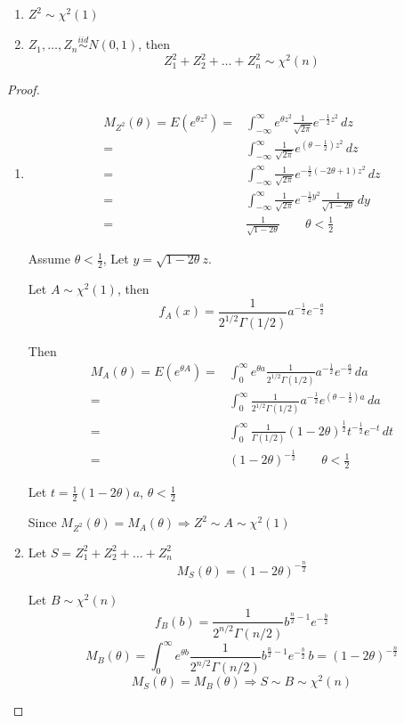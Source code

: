 \begin{exmp}
\begin{enumerate}
\item $Z^2 \sim \chi^2(1)$
\item $Z_1,\dots,Z_n \overset{iid}{\sim} N(0,1)$, then 
\[Z_1^2 +Z_2^2+\dots+Z_n^2 \sim \chi^2(n)\] 
\end{enumerate}
\begin{proof}
\begin{enumerate}
\item \begin{align*}
M_{Z^2}(\theta)=E(e^{\theta z^2}) = & \int_{-\infty}^\infty e^{\theta z^2} \frac{1}{\sqrt{2 \pi}} e^{-\frac{1}{2} z^2} \, dz \\
= & \int_{-\infty}^\infty \frac{1}{\sqrt{2 \pi}} e^{\left(\theta-\frac{1}{2}\right) z^2} \,dz \\
= & \int_{-\infty}^\infty  \frac{1}{\sqrt{2 \pi}} e^{-\frac{1}{2}\left(-2\theta+1\right) z^2} \,dz \\
= & \int_{-\infty}^\infty  \frac{1}{\sqrt{2 \pi}} e^{-\frac{1}{2} y^2} \frac{1}{\sqrt{1-2\theta}} \,dy \\
= & \frac{1}{\sqrt{1-2\theta}} \qquad \theta<\frac{1}{2}
\end{align*}

Assume $\theta <\frac{1}{2}$, Let $y=\sqrt{1-2\theta} z$.

Let $A \sim \chi^2(1)$, then
\[f_A(x)=\frac{1}{2^{1/2} \Gamma(1/2)} a^{-\frac{1}{2}} e^{-\frac{a}{2}}	\]

Then
\begin{align*}
M_A(\theta)=E(e^{\theta A}) = & \int_0^\infty	e^{\theta a}\frac{1}{2^{1/2} \Gamma(1/2)} a^{-\frac{1}{2}} e^{-\frac{a}{2}}\,da	\\
= & \int_0^\infty \frac{1}{2^{1/2} \Gamma(1/2)}  a^{-\frac{1}{2}} e^{\left(\theta-\frac{1}{2}\right)a}\,da \\
= & \int_0^\infty \frac{1}{\Gamma(1/2)} (1-2\theta)^{\frac{1}{2}} t^{-\frac{1}{2}} e^{-t} \,dt	\\
= & (1-2\theta)^{-\frac{1}{2}}  \qquad \theta<\frac{1}{2}
\end{align*}

Let $t=\frac{1}{2} (1-2\theta)a$, $\theta<\frac{1}{2}$ 

Since $M_{Z^2}(\theta)=M_A(\theta) \Rightarrow Z^2\sim A\sim \chi^2(1)$
\item Let $S=Z_1^2 +Z_2^2+\dots+Z_n^2$
\[M_S(\theta)=(1-2\theta)^{-\frac{n}{2}}\]

Let $B \sim \chi^2(n)$
\[f_B(b)=\frac{1}{2^{n/2} \Gamma(n/2)} b^{\frac{n}{2}-1} e^{-\frac{b}{2}}	\]
\[M_B(\theta)= \int_0^\infty e^{\theta b}	\frac{1}{2^{n/2} \Gamma(n/2)} b^{\frac{n}{2}-1} e^{-\frac{b}{2}} \,b=(1-2\theta)^{-\frac{n}{2}}\]
\[M_S(\theta)=M_B(\theta) \Rightarrow S \sim B \sim \chi^2(n)\]
\end{enumerate}
\end{proof}
\end{exmp}

